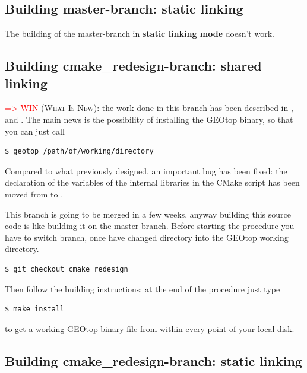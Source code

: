 \subsection{Building master-branch: static linking}

The building of the master-branch in \textbf{static linking mode} doesn't work.

\subsection{Building cmake\_redesign-branch: shared linking}

\textsc{\textcolor{red}{=> WIN} (What Is New):} the work done in this branch has been described in ,  and . The main news is the possibility of installing the GEOtop binary, so that you can just call

\begin{lstlisting}[style=bashStyle]
$ geotop /path/of/working/directory
\end{lstlisting} %

Compared to what previously designed, an important bug has been fixed: the declaration of the variables of the internal libraries in the CMake script has been moved from  to .

This branch is going to be merged in a few weeks, anyway building this source code is like building it on the master branch. Before starting the procedure you have to switch branch, once have changed directory into the GEOtop working directory.

\begin{lstlisting}[style=bashStyle]
$ git checkout cmake_redesign
\end{lstlisting} %

Then follow the building instructions; at the end of the procedure just type

\begin{lstlisting}[style=bashStyle]
$ make install
\end{lstlisting} %

to get a working GEOtop binary file from within every point of your local disk.

\subsection{Building cmake\_redesign-branch: static linking}